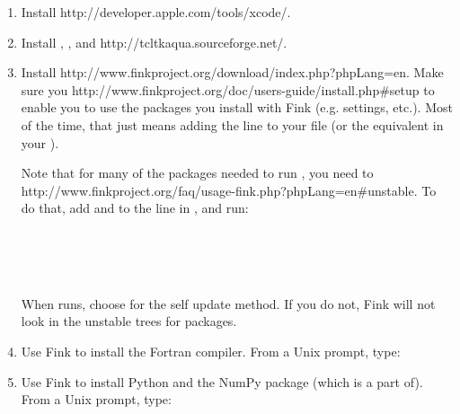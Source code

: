 \begin{enumerate}
\item Install
		{http://developer.apple.com/tools/xcode/}.

\item Install 
	, 
	, and 
		{http://tcltkaqua.sourceforge.net/}.

\item Install
		{http://www.finkproject.org/download/index.php?phpLang=en}.
	Make sure you
		{http://www.finkproject.org/doc/users-guide/install.php\#setup}
	to enable you to use the packages you install with Fink
	(e.g.  settings, etc.).
	Most of the time, that just means adding the line
	 to your  file (or the
	equivalent in your ).

	Note that for many of the packages needed to run ,
	you need to 
	{http://www.finkproject.org/faq/usage-fink.php?phpLang=en\#unstable}.
	To do that, add  and 
	to the  line in , and run:

	\begin{codeblock}
	 \\
	 \\
	 \\
	\end{codeblock}

	When  runs, choose  for the
	self update method.  If you do not, Fink will not look in the
	unstable trees for packages.

\item Use Fink to install the  Fortran compiler.
	From a Unix prompt, type:

	\begin{codeblock}
	\codeblockfont{fink -$\,\!$-use-binary-dist install g95}
	\end{codeblock}

\item Use Fink to install Python 
	and the NumPy package (which  is a part of).
	From a Unix prompt, type:


\end{enumerate}
